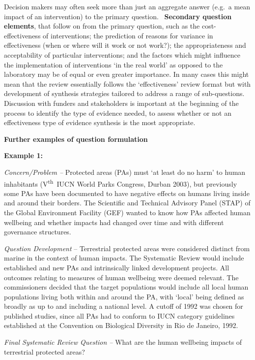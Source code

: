 \documentclass[
  letterpaper,
  DIV=11,
  numbers=noendperiod]{scrreprt}
\begin{document}
Decision makers may often seek more than just an aggregate answer
(e.g.~a mean impact of an intervention) to the primary question.~
\textbf{Secondary question elements}, that follow on from the primary
question, such as the cost-effectiveness of interventions; the
prediction of reasons for variance in effectiveness (when or where will
it work or not work?); the appropriateness and acceptability of
particular interventions; and the factors which might influence the
implementation of interventions `in the real world' as opposed to the
laboratory may be of equal or even greater importance. In many cases
this might mean that the review essentially follows the `effectiveness'
review format but with development of synthesis strategies tailored to
address a range of sub-questions. Discussion with funders and
stakeholders is important at the beginning of the process to identify
the type of evidence needed, to assess whether or not an effectiveness
type of evidence synthesis is the most appropriate.

\textbf{Further examples of question formulation}

\textbf{Example 1:}

\emph{Concern/Problem --} Protected areas (PAs) must `at least do no
harm' to human inhabitants (V\textsuperscript{th}~IUCN World Parks
Congress, Durban 2003), but previously some PAs have been documented to
have negative effects on humans living inside and around their borders.
The Scientific and Technical Advisory Panel (STAP) of the Global
Environment Facility (GEF) wanted to know how PAs affected human
wellbeing and whether impacts had changed over time and with different
governance structures.

\emph{Question Development} -- Terrestrial protected areas were
considered distinct from marine in the context of human impacts. The
Systematic Review would include established and new PAs and
intrinsically linked development projects. All outcomes relating to
measures of human wellbeing were deemed relevant. The commissioners
decided that the target populations would include all local human
populations living both within and around the PA, with `local' being
defined as broadly as up to and including a national level. A cutoff of
1992 was chosen for published studies, since all PAs had to conform to
IUCN category guidelines established at the Convention on Biological
Diversity in Rio de Janeiro, 1992.

\emph{Final Systematic Review Question --} What are the human wellbeing
impacts of terrestrial protected areas?
\end{document}
